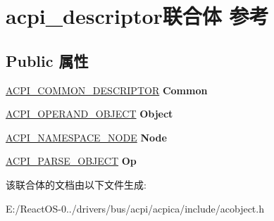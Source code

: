 \hypertarget{unionacpi__descriptor}{}\section{acpi\+\_\+descriptor联合体 参考}
\label{unionacpi__descriptor}
\subsection*{Public 属性}
\begin{DoxyCompactItemize}
\item 
\mbox{\label{unionacpi__descriptor_a95c3c945745cd221eac2072375e6b990}} 
\hyperlink{structacpi__common__descriptor}{A\+C\+P\+I\+\_\+\+C\+O\+M\+M\+O\+N\+\_\+\+D\+E\+S\+C\+R\+I\+P\+T\+OR} {\bfseries Common}
\item 
\mbox{\label{unionacpi__descriptor_ab8a6ab04612a327cbdd2aefc7a5b2c38}} 
\hyperlink{unionacpi__operand__object}{A\+C\+P\+I\+\_\+\+O\+P\+E\+R\+A\+N\+D\+\_\+\+O\+B\+J\+E\+CT} {\bfseries Object}
\item 
\mbox{\label{unionacpi__descriptor_a0bc47a0e343f530ce8bedb338fb3427f}} 
\hyperlink{structacpi__namespace__node}{A\+C\+P\+I\+\_\+\+N\+A\+M\+E\+S\+P\+A\+C\+E\+\_\+\+N\+O\+DE} {\bfseries Node}
\item 
\mbox{\label{unionacpi__descriptor_affe86533e00fc1e0471e031fa7fdf97b}} 
\hyperlink{unionacpi__parse__object}{A\+C\+P\+I\+\_\+\+P\+A\+R\+S\+E\+\_\+\+O\+B\+J\+E\+CT} {\bfseries Op}
\end{DoxyCompactItemize}


该联合体的文档由以下文件生成\+:\begin{DoxyCompactItemize}
\item 
E\+:/\+React\+O\+S-\/0../drivers/bus/acpi/acpica/include/acobject.\+h\end{DoxyCompactItemize}
